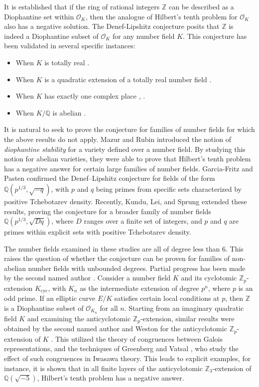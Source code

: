 \documentclass[12pt]{amsart}
\newcommand{\Z}{\mathbb{Z}}
\newcommand{\Q}{\mathbb{Q}}
\newcommand{\cO}{\mathcal{O}}
\newcommand{\op}[1]{\operatorname{#1}}
\numberwithin{equation}{section}
\begin{document}
It is established that if the ring of rational integers $\mathbb{Z}$ can be described as a Diophantine set within $\cO_K$, then the analogue of Hilbert's tenth problem for $\cO_K$ also has a negative solution. The Denef-Lipshitz conjecture posits that $\mathbb{Z}$ is indeed a Diophantine subset of $\cO_K$ for any number field $K$. This conjecture has been validated in several specific instances:
\begin{itemize}
    \item When $K$ is totally real \cite{denef1980diophantine}.
    \item When $K$ is a quadratic extension of a totally real number field \cite{denef1978diophantine}.
    \item When $K$ has exactly one complex place \cite{shlapentokh1989extension}, \cite{pheidas1988hilbert}.
    \item When $K/\mathbb{Q}$ is abelian \cite{shapiro1989diophantine}.
\end{itemize}
It is natural to seek to prove the conjecture for families of number fields for which the above results do not apply. Mazur and Rubin \cite{mazur2018diophantine} introduced the notion of \emph{diophantine stability} for a variety defined over a number field. By studying this notion for abelian varieties, they were able to prove that Hilbert's tenth problem has a negative answer for certain large families of number fields. Garcia-Fritz and Pasten \cite{Gracia-Fitzen-Pasten} confirmed the Denef--Lipshitz conjecture for fields of the form $\mathbb{Q}(p^{1/3}, \sqrt{-q})$, with $p$ and $q$ being primes from specific sets characterized by positive Tchebotarev density. Recently, Kundu, Lei, and Sprung \cite{kundu-lei-sprung} extended these results, proving the conjecture for a broader family of number fields $\mathbb{Q}(p^{1/3}, \sqrt{Dq})$, where $D$ ranges over a finite set of integers, and $p$ and $q$ are primes within explicit sets with positive Tchebotarev density.

The number fields examined in these studies are all of degree less than 6. This raises the question of whether the conjecture can be proven for families of non-abelian number fields with unbounded degrees. Partial progress has been made by the second named author \cite{ray-hilbert10}. Consider a number field $K$ and its cyclotomic $\mathbb{Z}_p$-extension $K_{\op{cyc}}$, with $K_n$ as the intermediate extension of degree $p^n$, where $p$ is an odd prime. If an elliptic curve $E/K$ satisfies certain local conditions at $p$, then $\mathbb{Z}$ is a Diophantine subset of $\cO_{K_n}$ for all $n$. Starting from an imaginary quadratic field $K$ and examining the anticyclotomic $\mathbb{Z}_p$-extension, similar results were obtained by the second named author and Weston for the anticyclotomic $\mathbb{Z}_p$-extension of $K$ \cite{ray-weston}. This utilized the theory of congruences between Galois representations, and the techniques of Greenberg and Vatsal \cite{greenbergvatsal}, who study the effect of such congruences in Iwasawa theory. This leads to explicit examples, for instance, it is shown that in all finite layers of the anticyclotomic $\Z_3$-extension of $\Q(\sqrt{-5})$, Hilbert's tenth problem has a negative answer.
\end{document}
